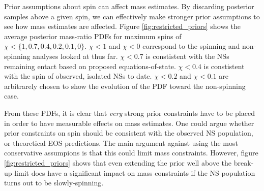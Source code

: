 Prior assumptions about spin can affect mass estimates.  By discarding posterior samples above a given spin, we can effectively make stronger prior assumptions to see how mass estimates are affected.  Figure \ref{fig:restricted_priors} shows the average posterior mass-ratio PDFs for maximum spins of $\chi < \{1, 0.7, 0.4, 0.2, 0.1, 0\}$.  $\chi<1$ and $\chi<0$ correspond to the spinning and non-spinning analyses looked at thus far.  $\chi<0.7$ is constistent with the NSs remaining entact based on proposed equations-of-state.  $\chi<0.4$ is constistent with the spin of observed, isolated NSs to date.  $\chi<0.2$ and $\chi<0.1$ are arbitrarely chosen to show the evolution of the PDF toward the non-spinning case.

From these PDFs, it is clear that \emph{very} strong prior constraints have to be placed in order to have measurable effects on mass estimates. One could argue whether prior constraints on spin should be consistent with the observed NS population, or theoretical EOS predictions.  The main argument against using the most conservative assumpions is that this could limit mass constraints.  However, figure \ref{fig:restricted_priors} shows that even extending the prior well above the break-up limit does have a significant impact on mass constraints if the NS population turns out to be slowly-spinning.
